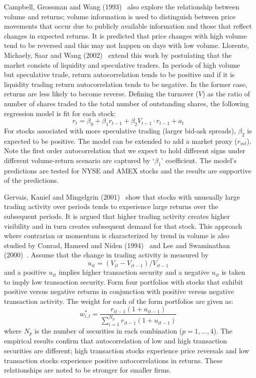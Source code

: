 Campbell, Grossman and Wang (1993)~\cite{campbellgross} also explore the relationship between volume and returns; volume information is used to distinguish between price movements that occur due to publicly available information and those that reflect changes in expected returns. It is predicted that price changes with high volume tend to be reversed and this may not happen on days with low volume. Llorente, Michaely, Saar and Wang (2002)~\cite{llmsw} extend this work by postulating that the market consists of liquidity and speculative traders. In periods of high volume but speculative trade, return autocorrelation tends to be positive and if it is liquidity trading return autocorrelation tends to be negative. In the former case, returns are less likely to become reverse. Defining the turnover ($V$) as the ratio of number of shares traded to the total number of outstanding shares, the following regression model is fit for each stock:
	\begin{equation}\label{eqn:regxt}
	r_t= \beta_0 + \beta_1 r_{t-1} + \beta_2 V_{t-1} \cdot r_{t-1} + a_t
	\end{equation}
For stocks associated with more speculative trading (larger bid-ask spreads), $\beta_2$ is expected to be positive. The model can be extended to add a market proxy ($r_{mt}$). Note the first order autocorrelation that we expect to hold different signs under different volume-return scenario are captured by `$\beta_1$' coefficient. The model's predictions are tested for NYSE and AMEX stocks and the results are supportive of the predictions. 


Gervais, Kaniel and Mingelgrin (2001)~\cite{germing} show that stocks with unusually large trading activity over periods tends to experience large returns over the subsequent periods. It is argued that higher trading activity creates higher visibility and in turn creates subsequent demand for that stock. This approach where contrarian or momentum is characterized by trend in volume is also studied by Conrad, Hameed and Niden (1994)~\cite{conniden} and Lee and Swaminathan (2000)~\cite{lee2000}. Assume that the change in trading activity is measured by
	\begin{equation}\label{eqn:uit3}
	u_{it}=(V_{it} - V_{it-1})/V_{it-1}
	\end{equation}   
and a positive $u_{it}$ implies higher transaction security and a negative $u_{it}$ is taken to imply low transaction security. Form four portfolios with stocks that exhibit positive versus negative returns in conjunction with positive versus negative transaction activity. The weight for each of the form portfolios are given as:
	\begin{equation}\label{eqn:wip3}
	w^*_{i,t} = \dfrac{r_{it-1}(1+u_{it-1})}{\sum_{i=1}^{N_p} r_{it-1}(1+u_{it-1})}
	\end{equation}
where $N_p$ is the number of securities in each combination ($p=1,\ldots,4$). The empirical results confirm that autocorrelation of low and high transaction securities are different; high transaction stocks experience price reversals and low transaction stocks experience positive autocorrelations in returns. These relationships are noted to be stronger for smaller firms. 


